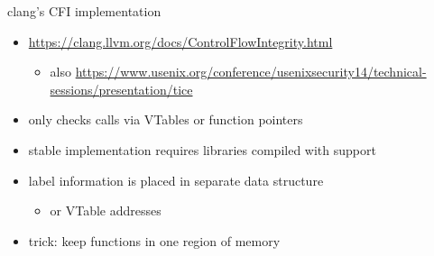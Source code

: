\begin{frame}{clang's CFI implementation}
\begin{itemize}
\item \url{https://clang.llvm.org/docs/ControlFlowIntegrity.html}
    \begin{itemize}
    \item \scriptsize also \url{https://www.usenix.org/conference/usenixsecurity14/technical-sessions/presentation/tice}
    \end{itemize}
\item only checks calls via VTables or function pointers
\item stable implementation requires libraries compiled with support
\item label information is placed in separate data structure
    \begin{itemize}
    \item {} or VTable addresses
    \end{itemize}
\item trick: keep functions in one region of memory
\end{itemize}
\end{frame}

